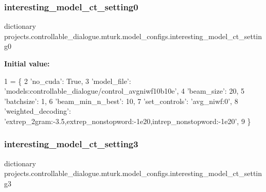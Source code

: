 \subsubsection{\texorpdfstring{interesting\+\_\+model\+\_\+ct\+\_\+setting0}{interesting\_model\_ct\_setting0}}
{\footnotesize\ttfamily dictionary projects.\+controllable\+\_\+dialogue.\+mturk.\+model\+\_\+configs.\+interesting\+\_\+model\+\_\+ct\+\_\+setting0}

{\bfseries Initial value\+:}
\begin{DoxyCode}
1 =  \{
2     \textcolor{stringliteral}{'no\_cuda'}: \textcolor{keyword}{True},
3     \textcolor{stringliteral}{'model\_file'}: \textcolor{stringliteral}{'models:controllable\_dialogue/control\_avgniwf10b10e'},
4     \textcolor{stringliteral}{'beam\_size'}: 20,
5     \textcolor{stringliteral}{'batchsize'}: 1,
6     \textcolor{stringliteral}{'beam\_min\_n\_best'}: 10,
7     \textcolor{stringliteral}{'set\_controls'}: \textcolor{stringliteral}{'avg\_niwf:0'},
8     \textcolor{stringliteral}{'weighted\_decoding'}: \textcolor{stringliteral}{'extrep\_2gram:-3.5,extrep\_nonstopword:-1e20,intrep\_nonstopword:-1e20'},
9 \}
\end{DoxyCode}
\mbox{\label{namespaceprojects_1_1controllable__dialogue_1_1mturk_1_1model__configs_a2b4368e0ad97b53af09cbc975a5ad2fa}} 
\subsubsection{\texorpdfstring{interesting\+\_\+model\+\_\+ct\+\_\+setting3}{interesting\_model\_ct\_setting3}}
{\footnotesize\ttfamily dictionary projects.\+controllable\+\_\+dialogue.\+mturk.\+model\+\_\+configs.\+interesting\+\_\+model\+\_\+ct\+\_\+setting3}

